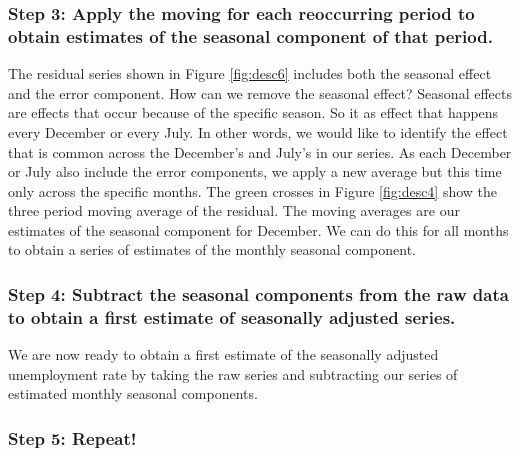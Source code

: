 \documentclass[]{book}
\begin{document}
\hypertarget{step-3-apply-the-moving-for-each-reoccurring-period-to-obtain-estimates-of-the-seasonal-component-of-that-period.}{%
\subsubsection*{Step 3: Apply the moving for each reoccurring period to obtain estimates of the seasonal component of that period.}\label{step-3-apply-the-moving-for-each-reoccurring-period-to-obtain-estimates-of-the-seasonal-component-of-that-period.}}

The residual series shown in Figure \ref{fig:desc6} includes both the seasonal effect and the error component. How can we remove the seasonal effect? Seasonal effects are effects that occur because of the specific season. So it as effect that happens every December or every July. In other words, we would like to identify the effect that is common across the December's and July's in our series. As each December or July also include the error components, we apply a new average but this time only across the specific months. The green crosses in Figure \ref{fig:desc4} show the three period moving average of the residual. The moving averages are our estimates of the seasonal component for December. We can do this for all months to obtain a series of estimates of the monthly seasonal component.

\hypertarget{step-4-subtract-the-seasonal-components-from-the-raw-data-to-obtain-a-first-estimate-of-seasonally-adjusted-series.}{%
\subsubsection*{Step 4: Subtract the seasonal components from the raw data to obtain a first estimate of seasonally adjusted series.}\label{step-4-subtract-the-seasonal-components-from-the-raw-data-to-obtain-a-first-estimate-of-seasonally-adjusted-series.}}

We are now ready to obtain a first estimate of the seasonally adjusted unemployment rate by taking the raw series and subtracting our series of estimated monthly seasonal components.

\hypertarget{step-5-repeat}{%
\subsubsection*{Step 5: Repeat!}\label{step-5-repeat}}
\end{document}
